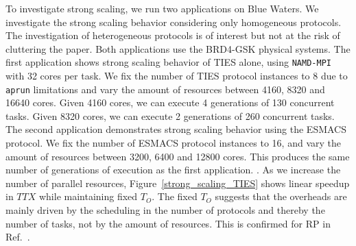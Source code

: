 To investigate strong scaling, we run two applications on Blue Waters. We 
investigate the strong scaling behavior considering only homogeneous protocols.
The investigation of heterogeneous protocols is of interest but not at the risk
of cluttering the paper. Both applications use the BRD4-GSK physical systems.
The first application shows strong scaling behavior of TIES alone, using
\texttt{NAMD-MPI} with 32 cores per task. We fix the number of TIES protocol 
instances to 8 due to \texttt{aprun} limitations and vary the amount of 
resources between 4160, 8320 and 16640 cores. Given 4160 cores, we can execute 4 
generations of 130 concurrent tasks. Given 8320 cores, we can execute 2 
generations of 260 concurrent tasks. The second application demonstrates strong
scaling behavior using the ESMACS protocol. We fix the number of ESMACS protocol
instances to 16, and vary the amount of resources between 3200, 6400 and 12800
cores. This produces the same number of generations of execution as the first 
application. . As we increase the number of parallel resources, 
Figure~\ref{strong_scaling_TIES} shows linear speedup in \(TTX\) while 
maintaining fixed $T_{O}$. The fixed $T_{O}$ suggests that the overheads are 
mainly driven by the scheduling in the number of protocols and 
thereby the number of tasks, not by the amount of resources. This is confirmed 
for RP in Ref.~\cite{merzky2018}.





